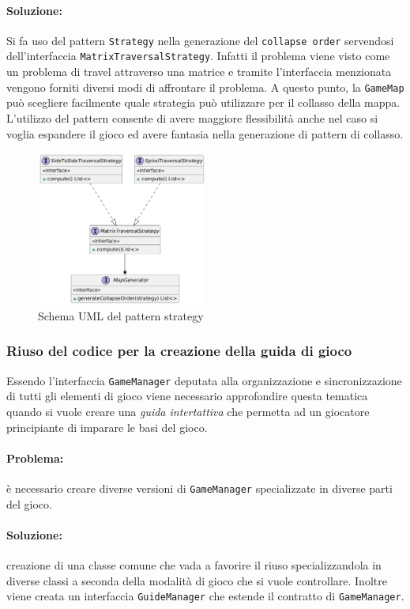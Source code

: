 \documentclass[a4paper,12pt]{report}
\begin{document}
\paragraph{Soluzione:} Si fa uso del pattern \texttt{Strategy} nella generazione del \texttt{collapse order} servendosi dell'interfaccia \texttt{MatrixTraversalStrategy}. Infatti il problema viene visto come un problema di travel attraverso una matrice e tramite l'interfaccia menzionata vengono forniti diversi modi di affrontare il problema.
\newline
A questo punto, la \texttt{GameMap} può scegliere facilmente quale strategia può utilizzare per il collasso della mappa. L'utilizzo del pattern consente di avere maggiore flessibilità anche nel caso si voglia espandere il gioco ed avere fantasia nella generazione di pattern di collasso.
%
\begin{figure}[H]
    \centering{}
    \includegraphics[width=0.5\textwidth]{img/matrix-trav-strat.png}
    \caption{Schema UML del pattern strategy}
    \label{img:mapgenerator-gamemap}
\end{figure}
\subsubsection{Riuso del codice per la creazione della guida di gioco}
Essendo l'interfaccia \texttt{GameManager} deputata alla organizzazione e sincronizzazione di tutti gli elementi di gioco viene necessario approfondire questa tematica quando si vuole creare una \textit{guida intertattiva} che permetta ad un giocatore principiante di imparare le basi del gioco.
\paragraph{Problema:}è necessario creare diverse versioni di \texttt{GameManager} specializzate in diverse parti del gioco. 
\paragraph{Soluzione:} creazione di una classe comune che vada a favorire il riuso specializzandola in diverse classi a seconda della modalità di gioco che si vuole controllare. Inoltre viene creata un interfaccia \texttt{GuideManager} che estende il contratto di \texttt{GameManager}. 
\end{document}
